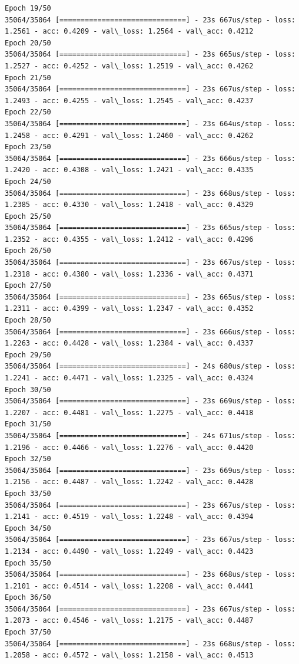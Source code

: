 \documentclass[11pt]{article}
\begin{document}
\begin{Verbatim}[commandchars=\\\{\}]
Epoch 19/50
35064/35064 [==============================] - 23s 667us/step - loss: 1.2561 - acc: 0.4209 - val\_loss: 1.2564 - val\_acc: 0.4212
Epoch 20/50
35064/35064 [==============================] - 23s 665us/step - loss: 1.2527 - acc: 0.4252 - val\_loss: 1.2519 - val\_acc: 0.4262
Epoch 21/50
35064/35064 [==============================] - 23s 667us/step - loss: 1.2493 - acc: 0.4255 - val\_loss: 1.2545 - val\_acc: 0.4237
Epoch 22/50
35064/35064 [==============================] - 23s 664us/step - loss: 1.2458 - acc: 0.4291 - val\_loss: 1.2460 - val\_acc: 0.4262
Epoch 23/50
35064/35064 [==============================] - 23s 666us/step - loss: 1.2420 - acc: 0.4308 - val\_loss: 1.2421 - val\_acc: 0.4335
Epoch 24/50
35064/35064 [==============================] - 23s 668us/step - loss: 1.2385 - acc: 0.4330 - val\_loss: 1.2418 - val\_acc: 0.4329
Epoch 25/50
35064/35064 [==============================] - 23s 665us/step - loss: 1.2352 - acc: 0.4355 - val\_loss: 1.2412 - val\_acc: 0.4296
Epoch 26/50
35064/35064 [==============================] - 23s 667us/step - loss: 1.2318 - acc: 0.4380 - val\_loss: 1.2336 - val\_acc: 0.4371
Epoch 27/50
35064/35064 [==============================] - 23s 665us/step - loss: 1.2311 - acc: 0.4399 - val\_loss: 1.2347 - val\_acc: 0.4352
Epoch 28/50
35064/35064 [==============================] - 23s 666us/step - loss: 1.2263 - acc: 0.4428 - val\_loss: 1.2384 - val\_acc: 0.4337
Epoch 29/50
35064/35064 [==============================] - 24s 680us/step - loss: 1.2241 - acc: 0.4471 - val\_loss: 1.2325 - val\_acc: 0.4324
Epoch 30/50
35064/35064 [==============================] - 23s 669us/step - loss: 1.2207 - acc: 0.4481 - val\_loss: 1.2275 - val\_acc: 0.4418
Epoch 31/50
35064/35064 [==============================] - 24s 671us/step - loss: 1.2196 - acc: 0.4466 - val\_loss: 1.2276 - val\_acc: 0.4420
Epoch 32/50
35064/35064 [==============================] - 23s 669us/step - loss: 1.2156 - acc: 0.4487 - val\_loss: 1.2242 - val\_acc: 0.4428
Epoch 33/50
35064/35064 [==============================] - 23s 667us/step - loss: 1.2141 - acc: 0.4519 - val\_loss: 1.2248 - val\_acc: 0.4394
Epoch 34/50
35064/35064 [==============================] - 23s 667us/step - loss: 1.2134 - acc: 0.4490 - val\_loss: 1.2249 - val\_acc: 0.4423
Epoch 35/50
35064/35064 [==============================] - 23s 668us/step - loss: 1.2101 - acc: 0.4514 - val\_loss: 1.2208 - val\_acc: 0.4441
Epoch 36/50
35064/35064 [==============================] - 23s 667us/step - loss: 1.2073 - acc: 0.4546 - val\_loss: 1.2175 - val\_acc: 0.4487
Epoch 37/50
35064/35064 [==============================] - 23s 668us/step - loss: 1.2058 - acc: 0.4572 - val\_loss: 1.2158 - val\_acc: 0.4513

\end{Verbatim}
\end{document}
